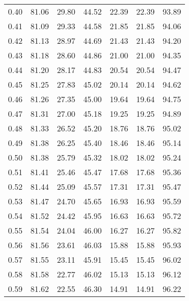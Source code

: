 \begin{tabular}{|c|c|c|c|c|c|c|}
      0.40 &     81.06 &     29.80 &      44.52 &   22.39 &      22.39 &         93.89 \\
      0.41 &     81.09 &     29.33 &      44.58 &   21.85 &      21.85 &         94.06 \\
      0.42 &     81.13 &     28.97 &      44.69 &   21.43 &      21.43 &         94.20 \\
      0.43 &     81.18 &     28.60 &      44.86 &   21.00 &      21.00 &         94.35 \\
      0.44 &     81.20 &     28.17 &      44.83 &   20.54 &      20.54 &         94.47 \\
      0.45 &     81.25 &     27.83 &      45.02 &   20.14 &      20.14 &         94.62 \\
      0.46 &     81.26 &     27.35 &      45.00 &   19.64 &      19.64 &         94.75 \\
      0.47 &     81.31 &     27.00 &      45.18 &   19.25 &      19.25 &         94.89 \\
      0.48 &     81.33 &     26.52 &      45.20 &   18.76 &      18.76 &         95.02 \\
      0.49 &     81.38 &     26.25 &      45.40 &   18.46 &      18.46 &         95.14 \\
      0.50 &     81.38 &     25.79 &      45.32 &   18.02 &      18.02 &         95.24 \\
      0.51 &     81.41 &     25.46 &      45.47 &   17.68 &      17.68 &         95.36 \\
      0.52 &     81.44 &     25.09 &      45.57 &   17.31 &      17.31 &         95.47 \\
      0.53 &     81.47 &     24.70 &      45.65 &   16.93 &      16.93 &         95.59 \\
      0.54 &     81.52 &     24.42 &      45.95 &   16.63 &      16.63 &         95.72 \\
      0.55 &     81.54 &     24.04 &      46.00 &   16.27 &      16.27 &         95.82 \\
      0.56 &     81.56 &     23.61 &      46.03 &   15.88 &      15.88 &         95.93 \\
      0.57 &     81.55 &     23.11 &      45.91 &   15.45 &      15.45 &         96.02 \\
      0.58 &     81.58 &     22.77 &      46.02 &   15.13 &      15.13 &         96.12 \\
      0.59 &     81.62 &     22.55 &      46.30 &   14.91 &      14.91 &         96.22 \\

\end{tabular}
